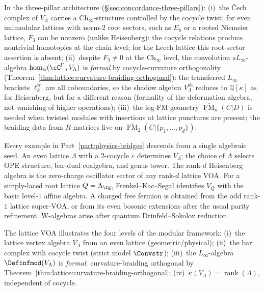 \begin{remark}
\label{rem:lattice-three-pillar}
In the three-pillar architecture
(\S\ref{sec:concordance-three-pillars}):
(i)~the \v{C}ech complex of $V_\Lambda$ carries a
$\mathrm{Ch}_\infty$-structure controlled by the cocycle twist; for
even unimodular lattices with norm-$2$ root sectors, such as $E_8$ or
a rooted Niemeier lattice, $F_3$ can be nonzero (unlike Heisenberg):
the cocycle relations produce nontrivial homotopies at the chain
level; for the Leech lattice this root-sector assertion is absent;
(ii)~despite $F_3 \neq 0$ at the $\mathrm{Ch}_\infty$ level, the
convolution $sL_\infty$-algebra
$\operatorname{hom}_\alpha(\cC^{\textup{!\textasciigrave}}, V_\Lambda)$ is
\emph{formal} by cocycle-curvature orthogonality
(Theorem~\ref{thm:lattice:curvature-braiding-orthogonal}): the
transferred $L_\infty$ brackets $\ell_k^{\mathrm{tr}}$ are all
coboundaries, so the shadow algebra
$V_\Lambda^{\mathrm{sh}}$ reduces to $\mathbb{Q}[\kappa]$ as for
Heisenberg, but for a different reason (formality of
the deformation algebra, not vanishing of higher operations);
(iii)~the log-FM geometry $\overline{\operatorname{FM}}_n(C|D)$ is
needed when twisted modules with insertions at lattice punctures are
present; the braiding data from $R$-matrices live on
$\overline{\operatorname{FM}}_2(C|\{p_1,\ldots,p_d\})$.
\end{remark}

Every example in Part~\ref{part:physics-bridges} descends from a single algebraic seed.
An even lattice $\Lambda$ with a 2-cocycle $\varepsilon$ determines
$V_\Lambda$; the choice of $\Lambda$ selects OPE
structure, bar-dual coalgebra, and genus tower.
The rank-$d$ Heisenberg algebra is the zero-charge oscillator sector
of any rank-$d$ lattice VOA. For a simply-laced root lattice
$Q=\Lambda_\fg$, Frenkel--Kac--Segal identifies $V_Q$ with the
basic level-$1$ affine algebra. A charged free fermion is obtained
from the odd rank-$1$ lattice super-VOA, or from its even bosonic
extensions after the usual parity refinement. W-algebras arise after
quantum Drinfeld--Sokolov reduction.

\begin{remark}
\label{rem:lattice-four-level}
The lattice VOA illustrates the four levels of the modular framework:
(i)~the lattice vertex algebra $V_\Lambda$ from an even lattice
(geometric/physical);
(ii)~the bar complex with cocycle twist
(strict model $\Convstr$);
(iii)~the $L_\infty$-algebra $\Definfmod(V_\Lambda)$ is
\emph{formal}: curvature-braiding orthogonal by
Theorem~\ref{thm:lattice:curvature-braiding-orthogonal};
(iv)~$\kappa(V_\Lambda) = \operatorname{rank}(\Lambda)$,
independent of cocycle.
\end{remark}


